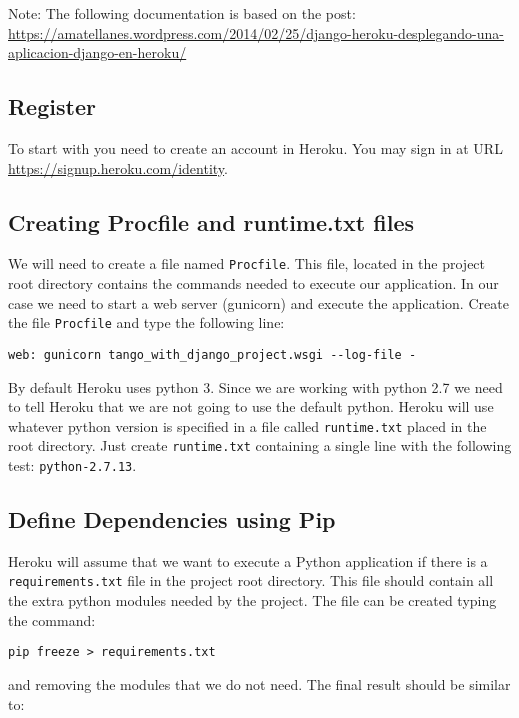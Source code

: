 \documentclass[12pt]{article} %
\begin{document}
Note: The following documentation is based on the post: \url{https://amatellanes.wordpress.com/2014/02/25/django-heroku-desplegando-una-aplicacion-django-en-heroku/}

\subsection{Register}
To start with you need to create an account in Heroku. You may sign in at URL \url{https://signup.heroku.com/identity}.

\subsection{Creating Procfile and runtime.txt files}

We will need to create a file named \texttt{Procfile}. This file, located in the project root directory contains the commands needed to execute our application. In our case we need to start a web server (gunicorn) and execute the application. Create the file \texttt{Procfile} and type the following line:

\begin{verbatim}
web: gunicorn tango_with_django_project.wsgi --log-file -
\end{verbatim}

By default Heroku uses python 3. Since we are working with python 2.7 we need to tell Heroku that we are not going to use the default python. Heroku will use whatever python version is specified in a file called \texttt{runtime.txt} placed in the root directory. Just create \texttt{runtime.txt} containing a single line with the following test: \texttt{python-2.7.13}.

\subsection{Define Dependencies using Pip}

Heroku will assume that we want to execute a Python application if there is a \texttt{requirements.txt} file in the project root directory. This file should contain all the extra python modules needed by the project. The file can be created typing the command:

\begin{verbatim}
pip freeze > requirements.txt
\end{verbatim}

and removing the modules that we do not need. The final result should be similar to:
\end{document}
